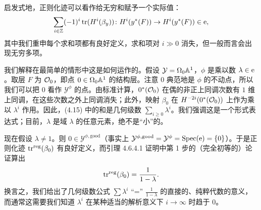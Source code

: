启发式地，正则化迹可以看作给无穷和赋予一个实际值：
\begin{equation}
  \sum_{i\in\mathbb{Z}}(-1)^i\operatorname{tr}(H^i(\beta_y))\colon H^i(y^*(F))\to H^i(y^*(F))\in\mathrm{e},
\end{equation}
其中我们重申每个求和项都有良好定义，求和项对 $i\gg 0$ 消失，但一般而言会出现无穷多项。

\begin{example}
我们解释在最简单的情形中这是如何运作的。假设 $\mathcal{Y}=\Omega_0\mathbb{A}^1$，$\phi$ 是乘以数 $\lambda\in\mathrm{e}$。取层 $F$ 为 $\mathcal{O}_0$，即点 $0\in\Omega_0\mathbb{A}^1$ 的结构层。注意 $0$ 典范地是 $\phi$ 的不动点，所以我们可以把 $0$ 看作 $\mathcal{Y}^{\phi}$ 的点。由标准计算，$0^*(\mathcal{O}_0)$ 在偶的非正上同调次数有 $1$ 维上同调，在这些次数之外上同调消失；此外，映射 $\beta_0$ 在 $H^{-2i}(0^*(\mathcal{O}_0))$ 上作为乘以 $\lambda^i$ 作用。因此，(4.15) 中的和是几何级数 $\sum_{i\ge 0}\lambda^i$。我们强调这是一个形式表达式；目前，$\lambda$ 是域 $\lambda$ 的任意元素，绝不是“小”的。%

现在假设 $\lambda\neq 1$。则 $0\in\mathcal{Y}^{\phi,\mathrm{good}}$（事实上 $\mathcal{Y}^{\phi,\mathrm{good}}=\mathcal{Y}^{\phi}=\operatorname{Spec}(\mathrm{e})=\{0\}$）。于是正则化迹 $\operatorname{tr}^{\mathrm{reg}}(\beta_0)$ 有良好定义，而引理 4.6.4.1 证明中第 1 步的（完全初等的）论证算出
\[
  \operatorname{tr}^{\mathrm{reg}}(\beta_0)=\frac{1}{1-\lambda}.
\]
换言之，我们给出了几何级数公式 $\sum\lambda^i\text{ “=” }\frac{1}{1-\lambda}$ 的直接的、纯粹代数的意义，而通常这需要我们知道 $\lambda^i$ 在某种适当的解析意义下 $i\to\infty$ 时趋于 $0$。
\end{example}

